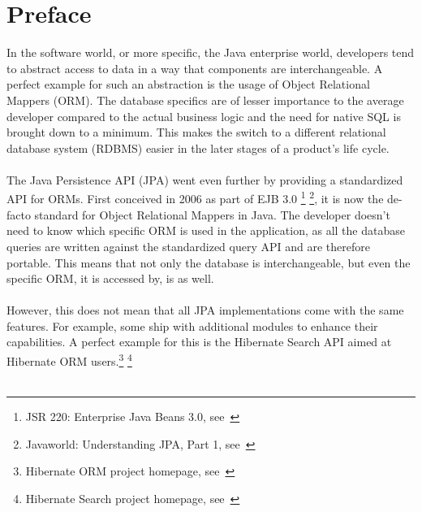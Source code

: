 
\section{Preface}\label{Preface}
In the software world, or more specific, the Java enterprise world, developers tend to abstract access to data in a way that components are interchangeable. A perfect example for such an abstraction is the usage of Object Relational Mappers (ORM). The database specifics are of lesser importance to the average developer compared to the actual business logic and the need for native SQL is brought down to a minimum. This makes the switch to a different relational database system (RDBMS) easier in the later stages of a product's life cycle.
\\\\
The Java Persistence API (JPA) went even further by providing a standardized API for ORMs. First conceived in 2006 as part of EJB 3.0 \footnote{JSR 220: Enterprise Java Beans 3.0, see~\cite{jsr_jpa1}} \footnote{Javaworld: Understanding JPA, Part 1, see~\cite{javaworld_jpa1}}, it is now the de-facto standard for Object Relational Mappers in Java. The developer doesn't need to know which specific ORM is used in the application, as all the database queries are written against the standardized query API and are therefore portable. This means that not only the database is interchangeable, but even the specific ORM, it is accessed by, is as well.
\\\\
However, this does not mean that all JPA implementations come with the same features. For example, some ship with additional modules to enhance their capabilities. A perfect example for this is the Hibernate Search API aimed at Hibernate ORM users.\footnote{Hibernate ORM project homepage, see~\cite{hibernate_orm}} \footnote{Hibernate Search project homepage, see~\cite{hibernate_search_homepage}}
\\\\

